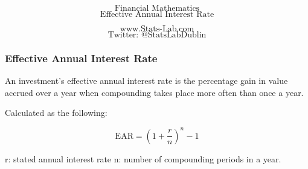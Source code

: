 \documentclass{beamer}
\begin{document}
\begin{frame}
\bigskip
{
\Huge
\[ \mbox{Financial Mathematics}  \]
\huge
\[ \mbox{Effective Annual Interest Rate}  \]
}

{
\LARGE
\[ \mbox{www.Stats-Lab.com}  \]
\[ \mbox{Twitter: @StatsLabDublin} \]
}
\end{frame}

\begin{frame}
\frametitle{Effective Annual Interest Rate}
\Large
An investment's effective annual interest rate is the percentage gain in value accrued over a year when compounding takes place more often than once a year. 

Calculated as the following:

\[ \mbox{EAR} = \left( 1 + \frac{r}{n}  \right)^n -1 \]

r: stated annual interest rate
n: number of compounding periods in a year.
\end{frame}
\end{document}
